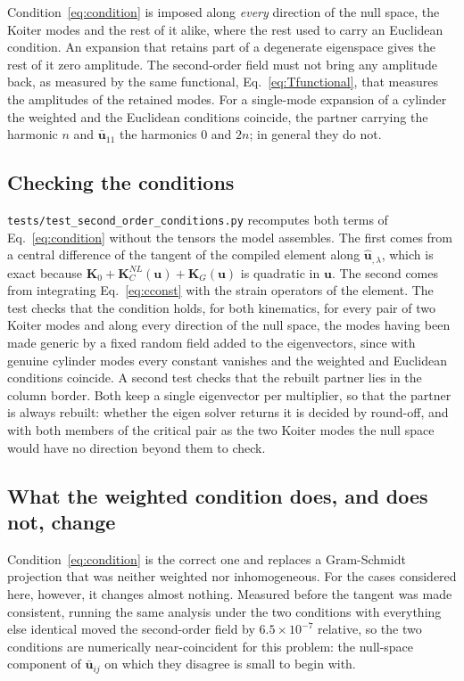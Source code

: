 \documentclass[11pt,a4paper]{article}
\begin{document}
Condition~\ref{eq:condition} is imposed along \emph{every} direction of the
null space, the Koiter modes and the rest of it alike, where the rest used to
carry an Euclidean condition.  An expansion that retains part of a
degenerate eigenspace gives the rest of it zero amplitude.  The second-order
field must not bring any amplitude back, as measured by the same functional,
Eq.~\ref{eq:Tfunctional}, that measures the amplitudes of the retained modes.
For a single-mode expansion of a cylinder the weighted and the Euclidean
conditions coincide, the partner carrying the harmonic $n$ and
$\boldsymbol{\bar{u}}_{11}$ the harmonics $0$ and $2n$; in general they do
not.

\subsection{Checking the conditions}
\label{sec:ortho-test}

\texttt{tests/test\_second\_order\_conditions.py} recomputes both terms of
Eq.~\ref{eq:condition} without the tensors the model assembles.  The first
comes from a central difference of the tangent of the compiled element along
$\boldsymbol{\hat{u}}_{,\lambda}$, which is exact because
$\boldsymbol{K}_0 + \boldsymbol{K}_C^{NL}(\boldsymbol{u}) +
\boldsymbol{K}_G(\boldsymbol{u})$ is quadratic in $\boldsymbol{u}$.  The
second comes from integrating Eq.~\ref{eq:cconst} with the strain operators
of the element.  The test checks that the condition holds, for both
kinematics, for every pair of two Koiter modes and along every direction of
the null space, the modes having been made generic by a fixed random field
added to the eigenvectors, since with genuine cylinder modes every constant
vanishes and the weighted and Euclidean conditions coincide.  A second test
checks that the rebuilt partner lies in the column border.  Both keep a single
eigenvector per multiplier, so that the partner is always rebuilt: whether
the eigen solver returns it is decided by round-off, and with both members of
the critical pair as the two Koiter modes the null space would have no
direction beyond them to check.

\subsection{What the weighted condition does, and does not, change}

Condition~\ref{eq:condition} is the correct one and replaces a Gram-Schmidt
projection that was neither weighted nor inhomogeneous.  For the cases
considered here, however, it changes almost nothing.  Measured before the
tangent was made consistent, running the same analysis under the two
conditions with everything else identical moved the second-order field by
$6.5\times10^{-7}$ relative, so the two conditions are numerically
near-coincident for this problem: the null-space component of
$\boldsymbol{\bar{u}}_{ij}$ on which they disagree is small to begin with.
\end{document}
